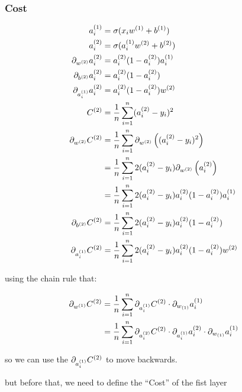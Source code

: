 \documentclass{article}
\begin{document}
\subsubsection{Cost}

\begin{align}
  a_{i}^{(1)} &= \sigma(x_{i}w^{(1)} + b^{(1)}) \\
  a_{i}^{(2)} &= \sigma(a_{i}^{(1)}w^{(2)} + b^{(2)}) \\
  \pd[w^{(2)}] a_{i}^{(2)} &= a_{i}^{(2)} (1 - a_{i}^{(2)}) a_{i}^{(1)} \\
  \pd[b^{(2)}] a_{i}^{(2)} &= a_{i}^{(2)} (1 - a_{i}^{(2)}) \\
  \pd[a_{i}^{(1)}] a_{i}^{(2)} &= a_{i}^{(2)} (1 - a_{i}^{(2)}) w^{(2)} \\
  C^{(2)} &= \avgsum[i, n] (a_{i}^{(2)} - y_{i})^{2} \\
  \pd[w^{(2)}] C^{(2)} &= \avgsum[i, n] \pd[w^{(2)}] \left( (a_{i}^{(2)} - y_{i})^{2} \right) \\
                 &= \avgsum[i, n] 2 (a_{i}^{(2)} - y_{i}) \pd[w^{(2)}] \left( a_{i}^{(2)} \right) \\
                 &= \avgsum[i, n] 2 (a_{i}^{(2)} - y_{i}) a_{i}^{(2)} (1 - a_{i}^{(2)}) a_{i}^{(1)} \\
  \pd[b^{(2)}] C^{(2)} &= \avgsum[i, n] 2 (a_{i}^{(2)} - y_{i}) a_{i}^{(2)} (1 - a_{i}^{(2)}) \\
  \pd[a_{i}^{(1)}] C^{(2)} &= \avgsum[i, n] 2 (a_{i}^{(2)} - y_{i}) a_{i}^{(2)} (1 - a_{i}^{(2)}) w^{(2)} \\
\end{align}

using the chain rule that:

\begin{align}
  \pd[w^{(1)}] C^{(2)} &= \avgsum[i, n] \pd[a_{i}^{(1)}] C^{(2)} \cdot \pd[w_{(1)}] a_{i}^{(1)} \\
                       &= \avgsum[i, n] \pd[a_{i}^{(2)}] C^{(2)} \cdot \pd[a_{i}^{(1)}] a_{i}^{(2)} \cdot \pd[w_{(1)}] a_{i}^{(1)}
\end{align}

so we can use the $\pd[a_{i}^{(1)}] C^{(2)}$ to move backwards.

but before that, we need to define the ``Cost'' of the fist layer
\end{document}
